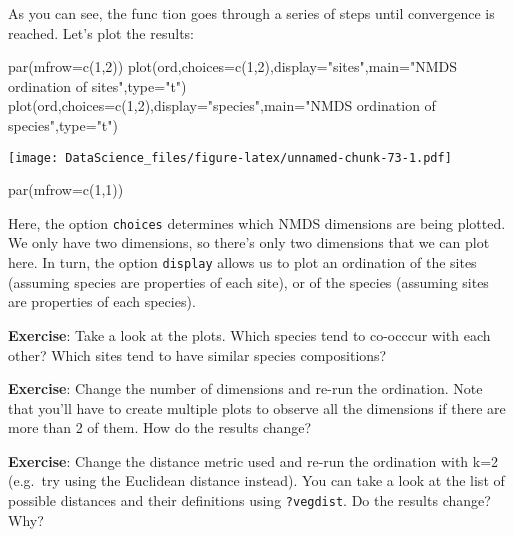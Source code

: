 \documentclass[
]{book}
\newenvironment{Shaded}{\begin{snugshade}}{\end{snugshade}}
\newcommand{\AttributeTok}[1]{\textcolor[rgb]{0.77,0.63,0.00}{#1}}
\newcommand{\DecValTok}[1]{\textcolor[rgb]{0.00,0.00,0.81}{#1}}
\newcommand{\FunctionTok}[1]{\textcolor[rgb]{0.00,0.00,0.00}{#1}}
\newcommand{\NormalTok}[1]{#1}
\newcommand{\StringTok}[1]{\textcolor[rgb]{0.31,0.60,0.02}{#1}}
\begin{document}
As you can see, the func tion goes through a series of steps until convergence is reached. Let's plot the results:

\begin{Shaded}
\begin{Highlighting}[]
\FunctionTok{par}\NormalTok{(}\AttributeTok{mfrow=}\FunctionTok{c}\NormalTok{(}\DecValTok{1}\NormalTok{,}\DecValTok{2}\NormalTok{))}
\FunctionTok{plot}\NormalTok{(ord,}\AttributeTok{choices=}\FunctionTok{c}\NormalTok{(}\DecValTok{1}\NormalTok{,}\DecValTok{2}\NormalTok{),}\AttributeTok{display=}\StringTok{"sites"}\NormalTok{,}\AttributeTok{main=}\StringTok{"NMDS ordination of sites"}\NormalTok{,}\AttributeTok{type=}\StringTok{"t"}\NormalTok{)}
\FunctionTok{plot}\NormalTok{(ord,}\AttributeTok{choices=}\FunctionTok{c}\NormalTok{(}\DecValTok{1}\NormalTok{,}\DecValTok{2}\NormalTok{),}\AttributeTok{display=}\StringTok{"species"}\NormalTok{,}\AttributeTok{main=}\StringTok{"NMDS ordination of species"}\NormalTok{,}\AttributeTok{type=}\StringTok{"t"}\NormalTok{)}
\end{Highlighting}
\end{Shaded}

\texttt{[image: DataScience\_files/figure-latex/unnamed-chunk-73-1.pdf]}

\begin{Shaded}
\begin{Highlighting}[]
\FunctionTok{par}\NormalTok{(}\AttributeTok{mfrow=}\FunctionTok{c}\NormalTok{(}\DecValTok{1}\NormalTok{,}\DecValTok{1}\NormalTok{))}
\end{Highlighting}
\end{Shaded}

Here, the option \texttt{choices} determines which NMDS dimensions are being plotted. We only have two dimensions, so there's only two dimensions that we can plot here. In turn, the option \texttt{display} allows us to plot an ordination of the sites (assuming species are properties of each site), or of the species (assuming sites are properties of each species).

\textbf{Exercise}: Take a look at the plots. Which species tend to co-occcur with each other? Which sites tend to have similar species compositions?

\textbf{Exercise}: Change the number of dimensions and re-run the ordination. Note that you'll have to create multiple plots to observe all the dimensions if there are more than 2 of them. How do the results change?

\textbf{Exercise}: Change the distance metric used and re-run the ordination with k=2 (e.g.~try using the Euclidean distance instead). You can take a look at the list of possible distances and their definitions using \texttt{?vegdist}. Do the results change? Why?
\end{document}
